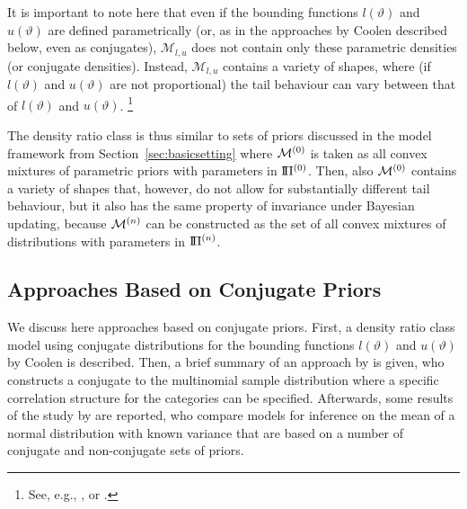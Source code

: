It is important to note here that even if the bounding functions $l(\vartheta)$ and $u(\vartheta)$ are defined parametrically
(or, as in the approaches by Coolen \parencite*{1993:coolen, 1994:coolen} described below, even as conjugates),
$\mathcal{M}_{l,u}$ does not contain only these parametric densities (or conjugate densities).
Instead, $\mathcal{M}_{l,u}$ contains a variety of shapes, where
(if $l(\vartheta)$ and $u(\vartheta)$ are not proportional)
the tail behaviour can vary between that of $l(\vartheta)$ and $u(\vartheta)$.%
\footnote{See, e.g., \cite[\S 3.2]{2011:rinderknecht}, or \cite[\S 4.3]{1991:pericchi}.}

The density ratio class is thus similar to sets of priors
discussed in the model framework from Section~\ref{sec:basicsetting} where
$\mathcal{M}^{(0)}$ is taken as all convex mixtures of parametric priors with parameters in $\text{I}\!\Pi^{(0)}$.
Then, also $\mathcal{M}^{(0)}$ contains a variety of shapes that, however,
do not allow for substantially different tail behaviour,
but it also has the same property of invariance under Bayesian updating,
because $\mathcal{M}^{(n)}$ can be constructed as the set of all convex mixtures of distributions with parameters in $\text{I}\!\Pi^{(n)}$.



\subsection{Approaches Based on Conjugate Priors}
\label{sec:alternatives:conjugate}

We discuss here approaches based on conjugate priors.
First, a density ratio class model using conjugate distributions
for the bounding functions $l(\vartheta)$ and $u(\vartheta)$
by Coolen \parencite*{1993:coolen,1994:coolen} is described.
Then, a brief summary of an approach by \textcite{2009:bickis} is given,
who constructs a conjugate to the multinomial sample distribution
where a specific correlation structure for the categories can be specified.
Afterwards, some results of the study by \textcite{1991:pericchi} are reported,
who compare models for inference on the mean of a normal distribution with known variance
that are based on a number of conjugate and non-conjugate sets of priors.
 

